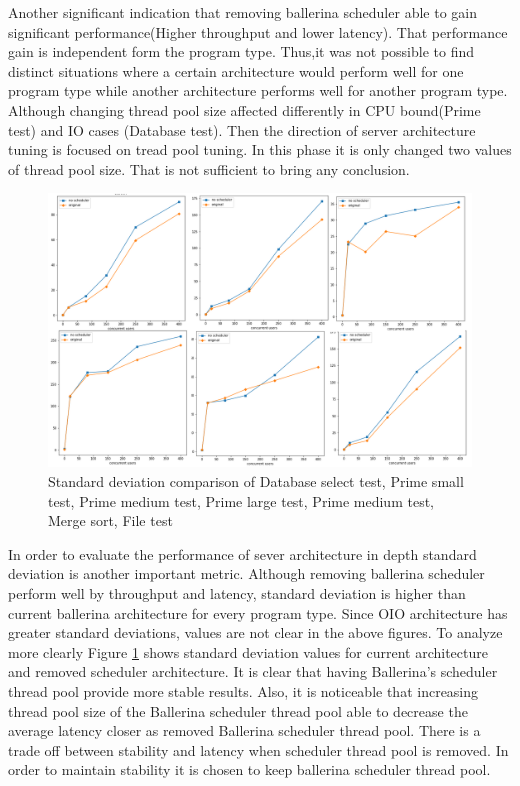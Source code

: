 Another significant indication that removing ballerina scheduler able to gain significant performance(Higher throughput and lower latency). That performance gain is independent form the program type. Thus,it was not possible to find distinct situations where a certain architecture would perform well for one program type while another architecture performs well for another program type. Although changing thread pool size affected differently in CPU bound(Prime test) and IO cases (Database test). Then the direction of server architecture tuning is focused on tread pool tuning. In this phase it is only changed two values of thread pool size. That is not sufficient to bring any conclusion.

\begin{figure}[htbp]
	\begin{center}
		\includegraphics[scale=1.2]{figures/db-ps-pm-pl-ms-fr.png}
	\end{center}
	\caption{Standard deviation comparison of Database select test, Prime small test, Prime medium test, Prime large test, Prime medium test, Merge sort, File test }
	\label{all_sd}
\end{figure}


In order to evaluate the performance of sever architecture in depth standard deviation is another important metric. Although removing ballerina scheduler perform well by throughput and latency, standard deviation is higher than current ballerina architecture for every program type. Since OIO architecture has greater standard deviations, values are not clear in the above figures. To analyze more clearly Figure \ref{all_sd} shows standard deviation values for current architecture and removed scheduler architecture. It is clear that having Ballerina's scheduler thread pool provide more stable results. Also, it is noticeable that increasing thread pool size of the Ballerina scheduler thread pool able to decrease the average latency closer as removed Ballerina scheduler thread pool. There is a trade off between stability and latency when scheduler thread pool is removed. In order to maintain stability it is chosen to keep ballerina scheduler thread pool.

